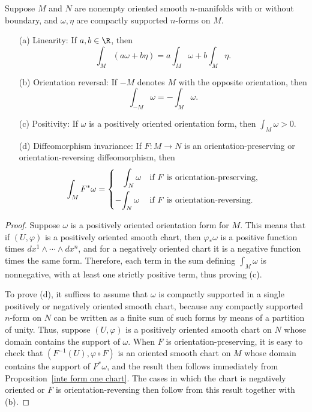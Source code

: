 \begin{proposition}\label{int form prop}
Suppose $M$ and $N$ are nonempty oriented smooth $n$-manifolds with or without boundary, and $\omega,\eta$ are compactly supported $n$-forms on $M$.
\begin{itemize}
\item[(a)] Linearity: If $a,b\in\R$, then
\[\int_M(a\omega+b\eta)=a\int_M\omega+b\int_M\eta.\]
\item[(b)] Orientation reversal: If $-M$ denotes $M$ with the opposite orientation,
then
\[\int_{-M}\omega=-\int_M\omega.\]
\item[(c)] Positivity: If $\omega$ is a positively oriented orientation form, then $\int_M\omega>0$.
\item[(d)] Diffeomorphism invariance: If $F:M\to N$ is an orientation-preserving
or orientation-reversing diffeomorphism, then
\[\int_MF^*\omega=\begin{cases}
\quad\displaystyle{\int_{N}\omega}&\text{if $F$ is orientation-preserving,}\vspace{1ex}\\
-\displaystyle{\int_{N}\omega}&\text{if $F$ is orientation-reversing.}
\end{cases}\]
\end{itemize}
\end{proposition}
\begin{proof}
Suppose $\omega$ is a positively oriented orientation form for $M$. This means that if $(U,\varphi)$ is a positively oriented smooth chart, then $\varphi_*\omega$ is a positive function times $dx^1\wedge\cdots\wedge dx^n$, and for a negatively oriented chart it is a negative function times the same form. Therefore, each term in the sum defining $\int_M\omega$ is nonnegative, with at least one strictly positive term, thus proving (c).\par
To prove (d), it suffices to assume that $\omega$ is compactly supported in a single positively or negatively oriented smooth chart, because any compactly supported $n$-form on $N$ can be written as a finite sum of such forms by means of a partition of unity. Thus, suppose $(U,\varphi)$ is a positively oriented smooth chart on $N$ whose domain contains the support of $\omega$. When $F$ is orientation-preserving, it is easy to check that $(F^{-1}(U),\varphi\circ F)$ is an oriented smooth chart on $M$ whose domain contains the support of $F^*\omega$, and the result then follows immediately from Proposition~\ref{inte form one chart}. The cases in which the chart is negatively oriented or $F$ is orientation-reversing then follow from this result together with (b).
\end{proof}
